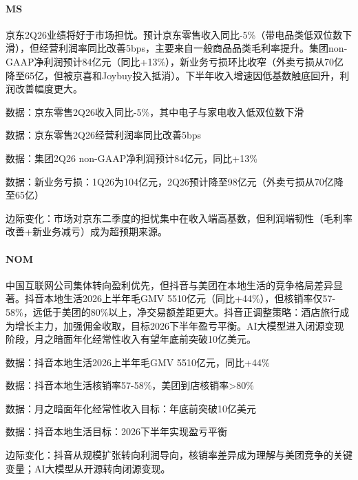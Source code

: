 \documentclass[11pt]{ctexart}
\begin{document}
\paragraph{MS} 京东2Q26业绩将好于市场担忧。预计京东零售收入同比-5\%（带电品类低双位数下滑），但经营利润率同比改善5bps，主要来自一般商品品类毛利率提升。集团non-GAAP净利润预计84亿元（同比+13\%），新业务亏损环比收窄（外卖亏损从70亿降至65亿，但被京喜和Joybuy投入抵消）。下半年收入增速因低基数触底回升，利润改善幅度更大。
{\small\color{refgray}数据：京东零售2Q26收入同比-5\%，其中电子与家电收入低双位数下滑\par}
{\small\color{refgray}数据：京东零售2Q26经营利润率同比改善5bps\par}
{\small\color{refgray}数据：集团2Q26 non-GAAP净利润预计84亿元，同比+13\%\par}
{\small\color{refgray}数据：新业务亏损：1Q26为104亿元，2Q26预计降至98亿元（外卖亏损从70亿降至65亿）\par}
{\small\color{refgray}边际变化：市场对京东二季度的担忧集中在收入端高基数，但利润端韧性（毛利率改善+新业务减亏）成为超预期来源。\par}
\paragraph{NOM} 中国互联网公司集体转向盈利优先，但抖音与美团在本地生活的竞争格局差异显著。抖音本地生活2026上半年毛GMV 5510亿元（同比+44\%），但核销率仅57-58\%，远低于美团的80\%以上，净交易额差距更大。抖音正调整策略：酒店旅行成为增长主力，加强佣金收取，目标2026下半年盈亏平衡。AI大模型进入闭源变现阶段，月之暗面年化经常性收入有望年底前突破10亿美元。
{\small\color{refgray}数据：抖音本地生活2026上半年毛GMV 5510亿元，同比+44\%\par}
{\small\color{refgray}数据：抖音本地生活核销率57-58\%，美团到店核销率>80\%\par}
{\small\color{refgray}数据：月之暗面年化经常性收入目标：年底前突破10亿美元\par}
{\small\color{refgray}数据：抖音本地生活目标：2026下半年实现盈亏平衡\par}
{\small\color{refgray}边际变化：抖音从规模扩张转向利润导向，核销率差异成为理解与美团竞争的关键变量；AI大模型从开源转向闭源变现。\par}
\end{document}

